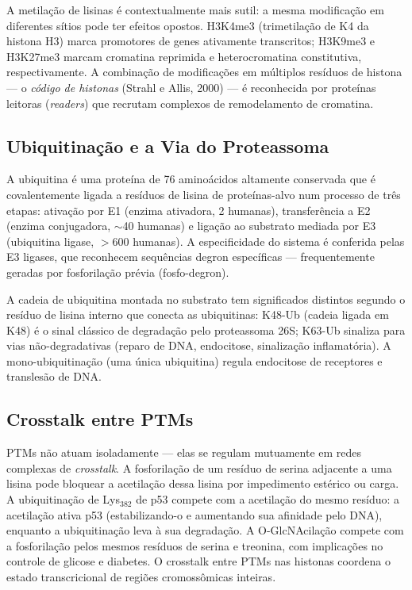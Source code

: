 A metilação de lisinas é contextualmente mais sutil: a mesma modificação em diferentes
sítios pode ter efeitos opostos. H3K4me3 (trimetilação de K4 da histona H3) marca
promotores de genes ativamente transcritos; H3K9me3 e H3K27me3 marcam cromatina
reprimida e heterocromatina constitutiva, respectivamente. A combinação de modificações
em múltiplos resíduos de histona --- o \emph{código de histonas} (Strahl e Allis, 2000)
--- é reconhecida por proteínas leitoras (\emph{readers}) que recrutam complexos de
remodelamento de cromatina.

\subsection{Ubiquitinação e a Via do Proteassoma}

A ubiquitina é uma proteína de 76 aminoácidos altamente conservada que é covalentemente
ligada a resíduos de lisina de proteínas-alvo num processo de três etapas: ativação por
E1 (enzima ativadora, 2 humanas), transferência a E2 (enzima conjugadora, $\sim$40
humanas) e ligação ao substrato mediada por E3 (ubiquitina ligase, $>$600 humanas). A
especificidade do sistema é conferida pelas E3 ligases, que reconhecem sequências
degron específicas --- frequentemente geradas por fosforilação prévia (fosfo-degron).

A cadeia de ubiquitina montada no substrato tem significados distintos segundo o resíduo
de lisina interno que conecta as ubiquitinas: K48-Ub (cadeia ligada em K48) é o sinal
clássico de degradação pelo proteassoma 26S; K63-Ub sinaliza para vias não-degradativas
(reparo de DNA, endocitose, sinalização inflamatória). A mono-ubiquitinação (uma única
ubiquitina) regula endocitose de receptores e translesão de DNA.

\subsection{Crosstalk entre PTMs}

PTMs não atuam isoladamente --- elas se regulam mutuamente em redes complexas de
\emph{crosstalk}. A fosforilação de um resíduo de serina adjacente a uma lisina pode
bloquear a acetilação dessa lisina por impedimento estérico ou carga. A ubiquitinação de
Lys$_{382}$ de p53 compete com a acetilação do mesmo resíduo: a acetilação ativa p53
(estabilizando-o e aumentando sua afinidade pelo DNA), enquanto a ubiquitinação leva à
sua degradação. A O-GlcNAcilação compete com a fosforilação pelos mesmos resíduos de
serina e treonina, com implicações no controle de glicose e diabetes. O crosstalk entre
PTMs nas histonas coordena o estado transcricional de regiões cromossômicas inteiras.

